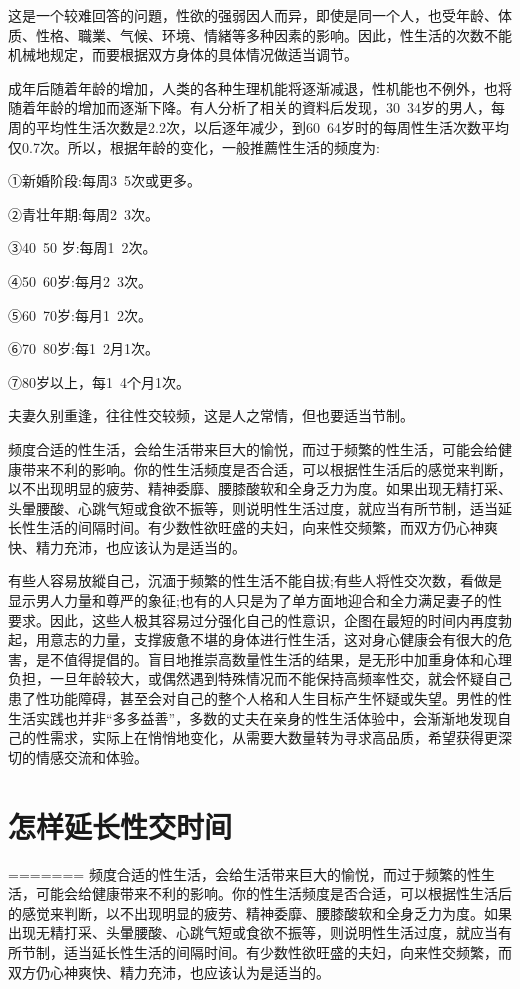 \documentclass[12pt,UTF8]{ctexbook}
\begin{document}
这是一个较难回答的问題，性欲的强弱因人而异，即使是同一个人，也受年龄、体质、性格、職業、气候、环境、情緒等多种因素的影响。因此，性生活的次数不能机械地规定，而要根据双方身体的具体情况做适当调节。

成年后随着年龄的增加，人类的各种生理机能将逐渐减退，性机能也不例外，也将随着年龄的增加而逐渐下降。有人分析了相关的資料后发现，30~34岁的男人，每周的平均性生活次数是2.2次，以后逐年减少，到60~64岁时的每周性生活次数平均仅0.7次。所以，根据年龄的变化，一般推薦性生活的频度为:

①新婚阶段:每周3~5次或更多。

②青壮年期:每周2~3次。

③40~50 岁:每周1~2次。

④50~60岁:每月2~3次。

⑤60~70岁:每月1~2次。

⑥70~80岁:每1~2月1次。

⑦80岁以上，每1~4个月1次。

夫妻久别重逢，往往性交较频，这是人之常情，但也要适当节制。

频度合适的性生活，会给生活带来巨大的愉悦，而过于频繁的性生活，可能会给健康带来不利的影响。你的性生活频度是否合适，可以根据性生活后的感觉来判断，以不出现明显的疲劳、精神委靡、腰膝酸软和全身乏力为度。如果出现无精打采、头暈腰酸、心跳气短或食欲不振等，则说明性生活过度，就应当有所节制，适当延长性生活的间隔时间。有少数性欲旺盛的夫妇，向来性交频繁，而双方仍心神爽快、精力充沛，也应该认为是适当的。

有些人容易放縱自己，沉湎于频繁的性生活不能自拔;有些人将性交次数，看做是显示男人力量和尊严的象征;也有的人只是为了单方面地迎合和全力满足妻子的性要求。因此，这些人极其容易过分强化自己的性意识，企图在最短的时间内再度勃起，用意志的力量，支撑疲惫不堪的身体进行性生活，这对身心健康会有很大的危害，是不值得提倡的。盲目地推崇高数量性生活的结果，是无形中加重身体和心理负担，一旦年龄较大，或偶然遇到特殊情况而不能保持高频率性交，就会怀疑自己患了性功能障碍，甚至会对自己的整个人格和人生目标产生怀疑或失望。男性的性生活实践也并非“多多益善”，多数的丈夫在亲身的性生活体验中，会渐渐地发现自己的性需求，实际上在悄悄地变化，从需要大数量转为寻求高品质，希望获得更深切的情感交流和体验。

\section{怎样延长性交时间}
=======
频度合适的性生活，会给生活带来巨大的愉悦，而过于频繁的性生活，可能会给健康带来不利的影响。你的性生活频度是否合适，可以根据性生活后的感觉来判断，以不出现明显的疲劳、精神委靡、腰膝酸软和全身乏力为度。如果出现无精打采、头暈腰酸、心跳气短或食欲不振等，则说明性生活过度，就应当有所节制，适当延长性生活的间隔时间。有少数性欲旺盛的夫妇，向来性交频繁，而双方仍心神爽快、精力充沛，也应该认为是适当的。
\end{document}
